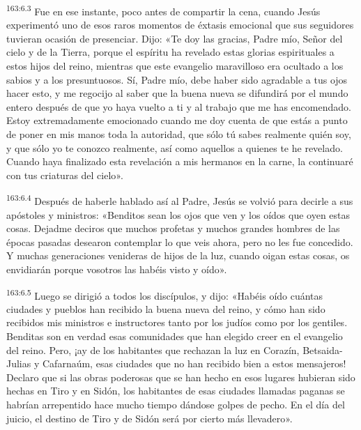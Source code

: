\par 
\textsuperscript{163:6.3} Fue en ese instante, poco antes de compartir la cena, cuando Jesús experimentó uno de esos raros momentos de éxtasis emocional que sus seguidores tuvieran ocasión de presenciar. Dijo: «Te doy las gracias, Padre mío, Señor del cielo y de la Tierra, porque el espíritu ha revelado estas glorias espirituales a estos hijos del reino, mientras que este evangelio maravilloso era ocultado a los sabios y a los presuntuosos. Sí, Padre mío, debe haber sido agradable a tus ojos hacer esto, y me regocijo al saber que la buena nueva se difundirá por el mundo entero después de que yo haya vuelto a ti y al trabajo que me has encomendado. Estoy extremadamente emocionado cuando me doy cuenta de que estás a punto de poner en mis manos toda la autoridad, que sólo tú sabes realmente quién soy, y que sólo yo te conozco realmente, así como aquellos a quienes te he revelado. Cuando haya finalizado esta revelación a mis hermanos en la carne, la continuaré con tus criaturas del cielo».

\par 
\textsuperscript{163:6.4} Después de haberle hablado así al Padre, Jesús se volvió para decirle a sus apóstoles y ministros: «Benditos sean los ojos que ven y los oídos que oyen estas cosas. Dejadme deciros que muchos profetas y muchos grandes hombres de las épocas pasadas desearon contemplar lo que veis ahora, pero no les fue concedido. Y muchas generaciones venideras de hijos de la luz, cuando oigan estas cosas, os envidiarán porque vosotros las habéis visto y oído».

\par 
\textsuperscript{163:6.5} Luego se dirigió a todos los discípulos, y dijo: «Habéis oído cuántas ciudades y pueblos han recibido la buena nueva del reino, y cómo han sido recibidos mis ministros e instructores tanto por los judíos como por los gentiles. Benditas son en verdad esas comunidades que han elegido creer en el evangelio del reino. Pero, ¡ay de los habitantes que rechazan la luz en Corazín, Betsaida-Julias y Cafarnaúm, esas ciudades que no han recibido bien a estos mensajeros! Declaro que si las obras poderosas que se han hecho en esos lugares hubieran sido hechas en Tiro y en Sidón, los habitantes de esas ciudades llamadas paganas se habrían arrepentido hace mucho tiempo dándose golpes de pecho. En el día del juicio, el destino de Tiro y de Sidón será por cierto más llevadero».

